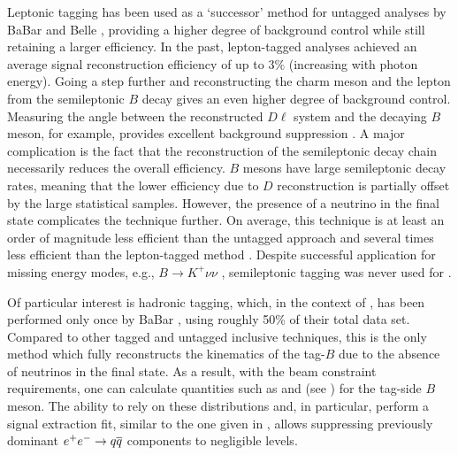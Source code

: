 Leptonic tagging has been used as a `successor' method for \BtoXsgamma untagged analyses by BaBar and Belle \cite{Belle:2009nth,BaBar:2012fqh,Belle:2016ufb}, providing a higher degree of background control while still retaining a larger efficiency.
In the past, lepton-tagged analyses achieved an average signal reconstruction efficiency of up to $3\%$ (increasing with photon energy).
Going a step further and reconstructing the charm meson and the lepton from the semileptonic $B$ decay gives an even higher degree of background control.
Measuring the angle between the reconstructed $D\ell$ system and the decaying $B$ meson, for example, provides excellent background suppression \cite{BaBar:2014omp}.
A major complication is the fact that the reconstruction of the semileptonic decay chain necessarily reduces the overall efficiency.
$B$ mesons have large semileptonic decay rates, meaning that the lower efficiency due to $D$ reconstruction is partially offset by the large statistical samples.
However, the presence of a neutrino in the final state complicates the technique further.
On average, this technique is at least an order of magnitude less efficient than the untagged approach and several times less efficient than the lepton-tagged method \cite{Belle-II:2018jsg}.
Despite successful application for missing energy modes, e.g., $B\rightarrow K^+\nu\nu$ \cite{BaBar:2009qvi}, semileptonic tagging was never used for \BtoXsgamma.

Of particular interest is hadronic tagging, which, in the context of \BtoXsgamma, has been performed only once by BaBar \cite{BaBar:2007yhb}, using roughly 50\% of their total data set.
Compared to other tagged and untagged inclusive techniques, this is the only method which fully reconstructs the kinematics of the tag-$B$ due to the absence of neutrinos in the final state.
As a result, with the beam constraint requirements, one can calculate quantities such as \Mbc and \DeltaE (see ) for the tag-side $B$ meson.
The ability to rely on these distributions and, in particular, perform a signal extraction fit, similar to the one given in , allows suppressing previously dominant $e^+e^-\rightarrow q\overline q$ components to negligible levels.

